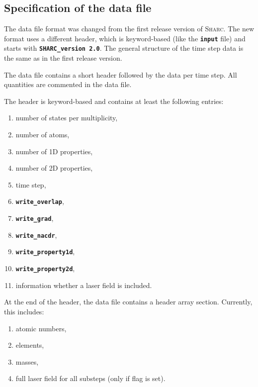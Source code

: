 \documentclass[a4paper,10pt,DIV=15,openany]{scrbook}
\newcommand{\sharc}{\textsc{Sharc}}
\newcommand{\ttt}[1]{\textbf{\texttt{#1}}}
\begin{document}
\subsection{Specification of the data file}

The data file format was changed from the first release version of \sharc. The new format uses a different header, which is keyword-based (like the \ttt{input} file) and starts with \ttt{SHARC\_version 2.0}. The general structure of the time step data is the same as in the first release version.

The data file contains a short header followed by the data per time step. All quantities are commented in the data file.

The header is keyword-based and contains at least the following entries:
\begin{enumerate}
  \item number of states per multiplicity,
  \item number of atoms,
  \item number of 1D properties,
  \item number of 2D properties,
  \item time step,
  \item \ttt{write\_overlap},
  \item \ttt{write\_grad},
  \item \ttt{write\_nacdr},
  \item \ttt{write\_property1d},
  \item \ttt{write\_property2d},
  \item information whether a laser field is included.
\end{enumerate}

At the end of the header, the data file contains a header array section. Currently, this includes:
\begin{enumerate}
  \item atomic numbers,
  \item elements,
  \item masses,
  \item full laser field for all substeps (only if flag is set).
\end{enumerate}
\end{document}
